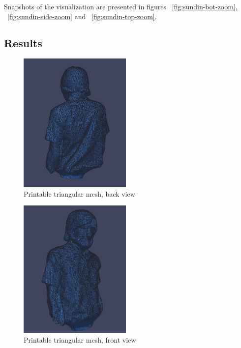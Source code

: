 Snapshots of the visualization are presented in figures ~\ref{fig:sundin-bot-zoom}, ~\ref{fig:sundin-side-zoom} and ~\ref{fig:sundin-top-zoom}.
\subsection{Results} 

\begin{figure}[ht!]
  \centering
    \includegraphics[width=0.49\textwidth]{figures/sundinPCLback.png}
    \caption{Printable triangular mesh, back view}
    \label{fig:sundin-back-pcl}
\end{figure}


\begin{figure}[ht!]
  \centering
    \includegraphics[width=0.49\textwidth]{figures/sundinPCLFront.png}
    \caption{Printable triangular mesh, front view}
    \label{fig:sundin-front-pcl}
\end{figure}



